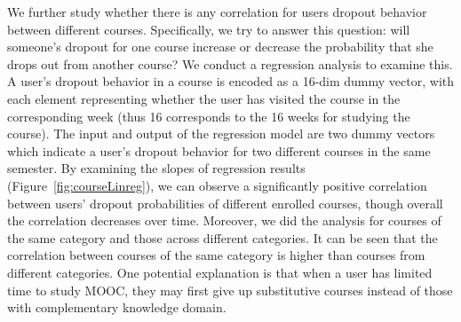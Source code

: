     
    We further study whether there is any correlation for users dropout behavior between different courses. 
    Specifically, we try to answer this question: will someone's dropout for one course increase or decrease the probability that she drops out from another course?
    We conduct a regression analysis to examine this.
    A user's dropout behavior in a course is encoded as a 16-dim dummy vector, with each element representing whether the user has visited the course in the corresponding week (thus 16 corresponds to the 16 weeks for studying the course). The input and output of the regression model are two dummy vectors which indicate a user's dropout behavior for two different courses in the same semester. By examining the slopes of regression results (Figure~\ref{fig:courseLinreg}), we can observe a significantly positive correlation between users' dropout probabilities of different enrolled courses, 
    though overall the correlation decreases over time. 
    Moreover, we did the analysis for courses of the same category and those across different categories. It can be seen that the correlation between courses of the same category is higher than courses from different categories. 
    One potential explanation is that when a user has limited time to study MOOC, they may first give up substitutive courses instead of those with complementary knowledge domain. 
    

	
